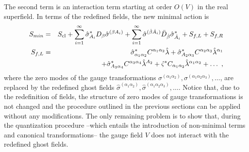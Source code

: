 \documentclass[a4paper,12pt]{article}
\begin{document}
The second term is an interaction term starting at order $O(V)$
in the real superfield.  In terms of the redefined fields, the new
minimal action is
\begin{eqnarray}\label{gau_3}
S_{min}&=&S_{\rm cl}+ \sum^{\infty}_{i=1}\hat\sigma_{A_i}^* D_\beta
\hat\sigma^{(\beta A_i)} +   
\sum^{\infty}_{i= 1} \hat\sigma^{(\dot \beta \dot A_i)}  \bar D_{\dot
  \beta} \hat\sigma_{\dot A_i}^*  
+ S_{f,L}+S_{f,R}\nonumber\\
S_{f,L}&=&\hat\sigma^*_{\alpha_1\alpha_2}C^{\alpha_1\alpha_2}\hat\lambda+
\hat\sigma^*_{A_2\alpha_3}
C^{\alpha_2\alpha_3}\hat\lambda^{\alpha_1}\nonumber\\ 
&& +\hat\sigma^*_{A_3\alpha_4} C^{\alpha_3\alpha_4}\hat\lambda^{A_2}
+\hat\varsigma^* C_{\alpha_1\alpha_2}\hat\lambda^{\alpha_1\alpha_2}
+ \ldots \ ,  
\end{eqnarray}
where the zero modes of the gauge transformations $\sigma^{(\alpha_1
  \alpha_2)}, \sigma^{(\alpha_1 \alpha_2 \alpha_3)}, \dots$, are
replaced by the redefined ghost fields $\hat\sigma^{(\alpha_1
  \alpha_2)} ,\hat\sigma^{(\alpha_1 \alpha_2 \alpha_3)}, \dots$.
Notice that, due to the redefinition of fields, the structure of zero
modes of gauge transformations is not changed and the procedure
outlined in the previous sections can be applied without any
modifications.  The only remaining problem is to show that, during the
quantization procedure --which entails the introduction of non-minimal
terms and canonical transformations-- the gauge field $V$ does not
interact with the redefined ghost fields.
\end{document}
